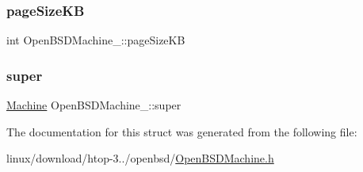 \subsubsection{\texorpdfstring{page\+Size\+KB}{pageSizeKB}}
{\footnotesize\ttfamily int Open\+B\+S\+D\+Machine\+\_\+\+::page\+Size\+KB}

\mbox{\label{structOpenBSDMachine___a8a545d14dad8c9652be6b1f7354b6a84}} 
\subsubsection{\texorpdfstring{super}{super}}
{\footnotesize\ttfamily \hyperlink{Machine_8h_aa3706f95e4706b9d02979efcabb1341d}{Machine} Open\+B\+S\+D\+Machine\+\_\+\+::super}



The documentation for this struct was generated from the following file\+:\begin{DoxyCompactItemize}
\item 
linux/download/htop-\/3../openbsd/\hyperlink{OpenBSDMachine_8h}{Open\+B\+S\+D\+Machine.\+h}\end{DoxyCompactItemize}
